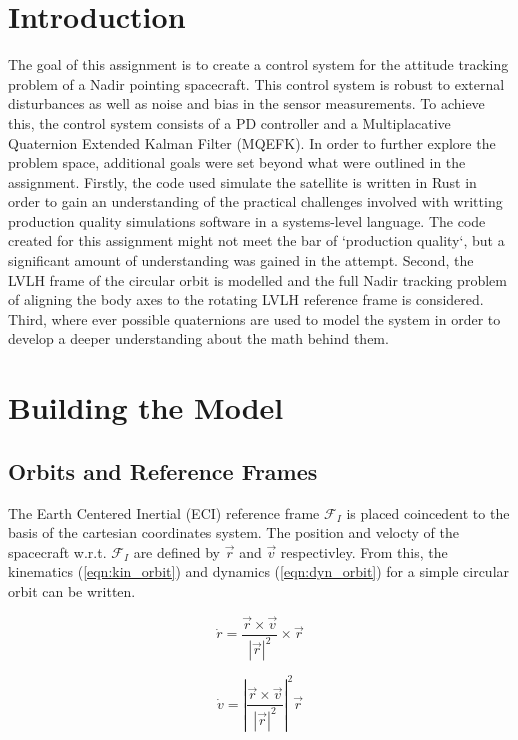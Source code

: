 \documentclass[a4paper]{article}
\begin{document}
\section{Introduction}

The goal of this assignment is to create a control system for the attitude tracking problem of a Nadir pointing spacecraft. This control system is robust to external disturbances as well as noise and bias in the sensor measurements. To achieve this, the control system consists of a PD controller and a Multiplacative Quaternion Extended Kalman Filter (MQEFK). In order to further explore the problem space, additional goals were set beyond what were outlined in the assignment. Firstly, the code used simulate the satellite is written in Rust in order to gain an understanding of the practical challenges involved with writting production quality simulations software in a systems-level language. The code created for this assignment might not meet the bar of `production quality`, but a significant amount of understanding was gained in the attempt. Second, the LVLH frame of the circular orbit is modelled and the full Nadir tracking problem of aligning the body axes to the rotating LVLH reference frame is considered. Third, where ever possible quaternions are used to model the system in order to develop a deeper understanding about the math behind them. 

\section{Building the Model}

\subsection{Orbits and Reference Frames}

The Earth Centered Inertial (ECI) reference frame $\mathcal{F}_I$ is placed coincedent to the basis of the cartesian coordinates system. The position and velocty of the spacecraft w.r.t. $\mathcal{F}_I$ are defined by $\vec{r}$ and $\vec{v}$ respectivley. From this, the kinematics (\ref{eqn:kin_orbit}) and dynamics (\ref{eqn:dyn_orbit}) for a simple circular orbit can be written.

\begin{equation}
	\dot{r} = \frac{\vec{r} \times \vec{v}}{|\vec{r}|^2} \times \vec{r}
	\label{eqn:kin_orbit}
\end{equation}

\begin{equation}
	\dot{v} = \left|\frac{\vec{r} \times \vec{v}}{|\vec{r}|^2}\right|^2 \vec{r} 
	\label{eqn:dyn_orbit}
\end{equation}
\end{document}
